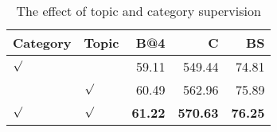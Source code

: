 \begin{table}[ht]
\centering
\small
\caption{The effect of topic and category supervision}
\label{tab:classify}
\begin{tabular}{llrrr}
\toprule
Category & Topic & B@4 & C & BS \\
\midrule
$\surd$ &  & 59.11 & 549.44 & 74.81 \\
 & $\surd$ & 60.49 & 562.96 & 75.89 \\
$\surd$ & $\surd$ & \textbf{61.22} & \textbf{570.63} & \textbf{76.25} \\
\bottomrule
\end{tabular}
\end{table}
